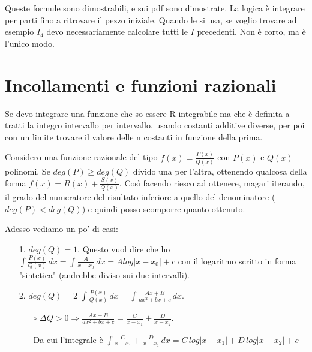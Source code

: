\documentclass{article}
\theoremstyle{definition}
\theoremstyle{definition}
\theoremstyle{definition}
\theoremstyle{definition}
\theoremstyle{definition}
\begin{document}
Queste formule sono dimostrabili, e sui pdf sono dimostrate. La logica è integrare per parti fino a ritrovare il pezzo iniziale. Quando le si usa, se voglio trovare ad esempio $I_4$ devo necessariamente calcolare tutti le $I$ precedenti. Non è corto, ma è l'unico modo.

\newpage
\section{Incollamenti e funzioni razionali}

Se devo integrare una funzione che so essere R-integrabile ma che è definita a tratti la integro intervallo per intervallo, usando costanti additive diverse, per poi con un limite trovare il valore delle n costanti in funzione della prima.

\vspace{3mm}

Considero una funzione razionale del tipo $\displaystyle{f(x)=\frac{P(x)}{Q(x)}}$ con $P(x)$ e $Q(x)$ polinomi. Se $deg(P)\geq deg(Q)$ divido una per l'altra, ottenendo qualcosa della forma $\displaystyle{f(x)=R(x)+\frac{S(x)}{Q(x)}}$. Così facendo riesco ad ottenere, magari iterando, il grado del numeratore del risultato inferiore a quello del denominatore ($deg(P)<deg(Q)$) e quindi posso scomporre quanto ottenuto.

\vspace{3mm}

Adesso vediamo un po' di casi:

\begin{itemize}
    \item [1.] $deg(Q)=1$. 
                \newline
                Questo vuol dire che ho $\displaystyle{\int\frac{P(x)}{Q(x)}\,dx=\int\frac{A}{x-x_0}\,dx=Alog\left|x-x_0\right|+c}$ con il logaritmo scritto in forma "sintetica" (andrebbe diviso sui due intervalli).
    \item [2.] $deg(Q)=2$
                \newline
                $\displaystyle{\int\frac{P(x)}{Q(x)}\,dx=\int\frac{Ax+B}{ax^2+bx+c}\,dx}$.
                \begin{itemize}
                    \item [$\circ$] $\displaystyle{\Delta Q>0 \Rightarrow \frac{Ax+B}{ax^2+bx+c}=\frac{C}{x-x_1}+\frac{D}{x-x_2}}$. 
                    
                    Da cui l'integrale è $\displaystyle{\int\frac{C}{x-x_1}+\frac{D}{x-x_2}\,dx=C\,log\left|x-x_1\right|+D\,log\left|x-x_2\right|+c}$
                \end{itemize}
\end{itemize}   






\end{document}
